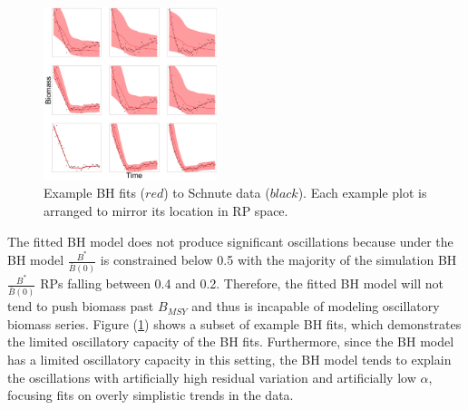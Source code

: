 %
\clearpage

%
\begin{figure}
\centering
\includegraphics[width=0.45\textwidth]{../ddBias/indexGridExpT45N300A0-1AS10K0.1.png}
\vspace{-0.45cm}
\caption{Example BH fits ($red$) to Schnute data ($black$). Each example plot is arranged to mirror its location in RP space.
}\label{bhGrid}
\end{figure}

%
The fitted BH model does not produce significant oscillations because
under the BH model $\frac{B^*}{\bar B(0)}$ is constrained below 0.5 with the
majority of the simulation BH $\frac{B^*}{\bar B(0)}$ RPs falling between 0.4 and 0.2. %
Therefore, the fitted BH model will not tend to push biomass past $B_{MSY}$ and
thus is incapable of modeling oscillatory biomass series. Figure (\ref{bhGrid})
shows a subset of example BH fits, which demonstrates the limited oscillatory
capacity of the BH fits. Furthermore, since the BH model has a limited
oscillatory capacity in this setting, the BH model tends to explain the
oscillations with artificially high residual variation and artificially low
$\alpha$, focusing fits on overly simplistic trends in the data.



